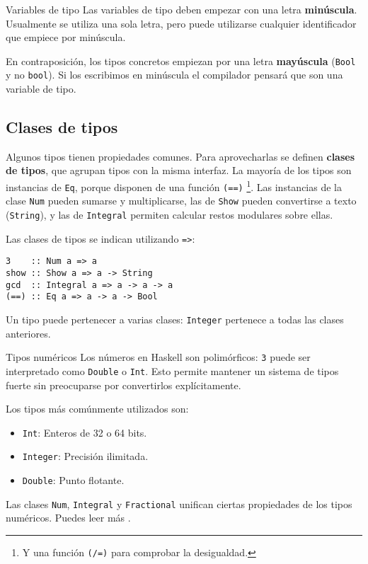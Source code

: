 \begin{extra}{Variables de tipo}
Las variables de tipo deben empezar con una letra \textbf{minúscula}.
Usualmente se utiliza una sola letra, pero puede
utilizarse cualquier identificador que empiece por minúscula.

\espacio

En contraposición, los tipos concretos empiezan por una letra
\textbf{mayúscula} (\texttt{Bool} y no \texttt{bool}). Si los escribimos en
minúscula el compilador pensará que son una variable de tipo.
\end{extra}

\subsection{Clases de tipos}

Algunos tipos tienen propiedades comunes. Para aprovecharlas se definen
\textbf{clases de tipos}, que agrupan tipos con la misma interfaz.
La mayoría de los tipos son instancias de \texttt{Eq},
porque disponen de una función \texttt{(==)} \footnote{Y una función \texttt{(/=)}
para comprobar la desigualdad.}.
Las instancias de la clase \texttt{Num} pueden sumarse y multiplicarse,
las de \texttt{Show} pueden convertirse a texto (\texttt{String}),
y las de \texttt{Integral} permiten calcular restos modulares sobre ellas.

\newpage

Las clases de tipos se indican utilizando \texttt{=>}:

\begin{lstlisting}
3    :: Num a => a
show :: Show a => a -> String
gcd  :: Integral a => a -> a -> a
(==) :: Eq a => a -> a -> Bool
\end{lstlisting}

Un tipo puede pertenecer a varias clases: \texttt{Integer} pertenece a todas las
clases anteriores.

\begin{extra}{Tipos numéricos}
Los números en Haskell son polimórficos: \texttt{3} puede ser interpretado como
\texttt{Double} o \texttt{Int}. Esto permite mantener un sistema de tipos fuerte
sin preocuparse por convertirlos explícitamente.

\espacio

Los tipos más comúnmente utilizados son:

\begin{itemize}
  \item \texttt{Int}: Enteros de 32 o 64 bits.
  \item \texttt{Integer}: Precisión ilimitada.
  \item \texttt{Double}: Punto flotante.
\end{itemize}

\espacio

Las clases \texttt{Num}, \texttt{Integral} y \texttt{Fractional} unifican ciertas
propiedades de los tipos numéricos. Puedes leer más
.
\end{extra}

